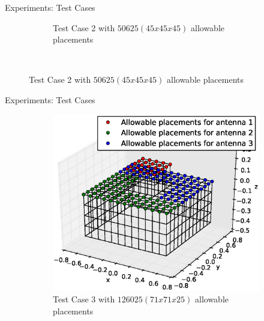 \documentclass{beamer}
\begin{document}
\begin{frame}{Experiments: Test Cases}
\begin{figure}
\begin{subfigure}{.5\columnwidth}
                    \caption{\tiny Test Case 2 with $50625 (45x45x45)$ allowable placements}%
                    \label{fig:tc2_figure}%
                \end{subfigure}\hfill\\%
            \end{figure}
        \end{frame}

        \begin{frame}{Experiments: Test Cases}
            \begin{figure}
                \centering
                \begin{subfigure}{.5\columnwidth}
                    \includegraphics[width=\columnwidth,height=\columnwidth]{../paper/FIG/tc_3_figure}%
                    \caption{\tiny Test Case 3 with $126025 (71x71x25)$ allowable placements}%
                    \label{fig:tc3_figure}%
                \end{subfigure}\hfill%
                \begin{subfigure}{.5\columnwidth}

\end{subfigure}
\end{figure}
\end{frame}
\end{document}
